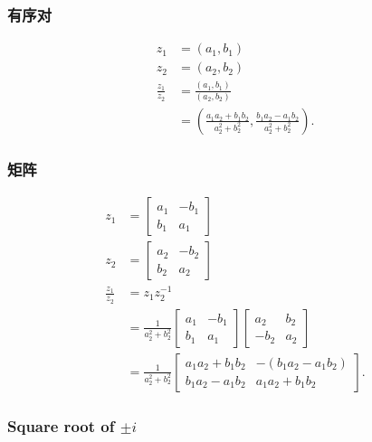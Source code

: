 \subsubsection*{有序对}
$$
\begin{aligned}
z_{1} & =\left(a_{1}, b_{1}\right) \\
z_{2} & =\left(a_{2}, b_{2}\right) \\
\frac{z_{1}}{z_{2}} & =\frac{\left(a_{1}, b_{1}\right)}{\left(a_{2}, b_{2}\right)} \\
& =\left(\frac{a_{1} a_{2}+b_{1} b_{2}}{a_{2}^{2}+b_{2}^{2}}, \frac{b_{1} a_{2}-a_{1} b_{2}}{a_{2}^{2}+b_{2}^{2}}\right) .
\end{aligned}
$$

\subsubsection*{矩阵}
$$
\begin{aligned}
z_{1} & =\left[\begin{array}{cc}
a_{1} & -b_{1} \\
b_{1} & a_{1}
\end{array}\right] \\
z_{2} & =\left[\begin{array}{cc}
a_{2} & -b_{2} \\
b_{2} & a_{2}
\end{array}\right] \\
\frac{z_{1}}{z_{2}} & =z_{1} z_{2}^{-1} \\
& =\frac{1}{a_{2}^{2}+b_{2}^{2}}\left[\begin{array}{cc}
a_{1} & -b_{1} \\
b_{1} & a_{1}
\end{array}\right]\left[\begin{array}{cc}
a_{2} & b_{2} \\
-b_{2} & a_{2}
\end{array}\right] \\
& =\frac{1}{a_{2}^{2}+b_{2}^{2}}\left[\begin{array}{ll}
a_{1} a_{2}+b_{1} b_{2} & -\left(b_{1} a_{2}-a_{1} b_{2}\right) \\
b_{1} a_{2}-a_{1} b_{2} & a_{1} a_{2}+b_{1} b_{2}
\end{array}\right] .
\end{aligned}
$$

\subsubsection{Square root of $\pm i$}

